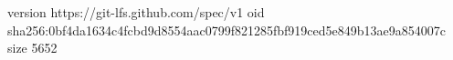 version https://git-lfs.github.com/spec/v1
oid sha256:0bf4da1634c4fcbd9d8554aac0799f821285fbf919ced5e849b13ae9a854007c
size 5652
